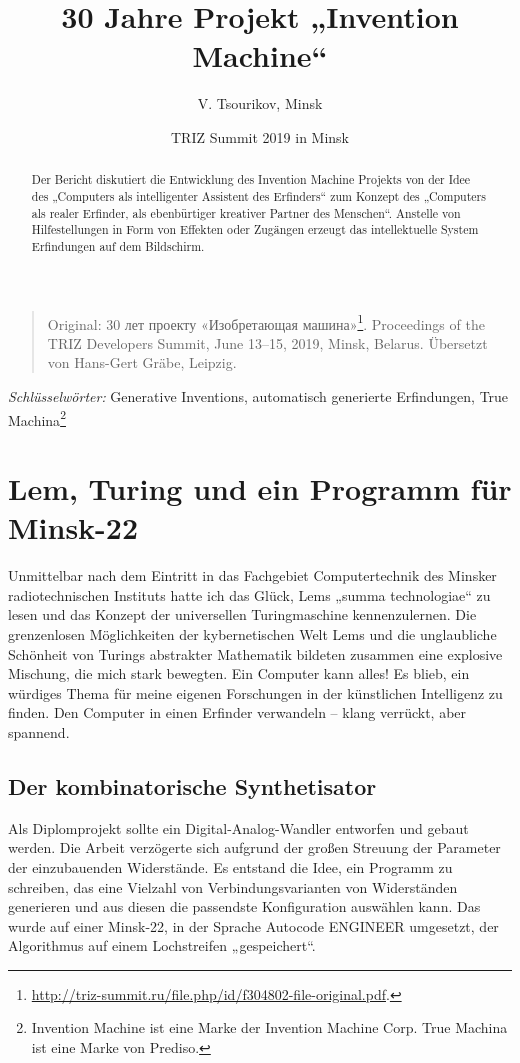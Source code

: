 \documentclass[11pt,a4paper]{article}
\title{30 Jahre Projekt „Invention Machine“}
\author{V. Tsourikov, Minsk}
\date{TRIZ Summit 2019 in Minsk}
\begin{document}
\maketitle
\begin{quote}
  Original: \foreignlanguage{russian}{30 лет проекту «Изобретающая
    машина»}\footnote{\url{http://triz-summit.ru/file.php/id/f304802-file-original.pdf}.}.
  Proceedings of the TRIZ Developers Summit, June 13--15, 2019, Minsk,
  Belarus.  Übersetzt von Hans-Gert Gräbe, Leipzig. 
\end{quote}

\begin{abstract}  
  Der Bericht diskutiert die Entwicklung des Invention Machine Projekts von der
  Idee des „Computers als intelligenter Assistent des Erfinders“ zum Konzept des
  „Computers als realer Erfinder, als ebenbürtiger kreativer Partner des
  Menschen“. Anstelle von Hilfestellungen in Form von Effekten oder Zugängen
  erzeugt das intellektuelle System Erfindungen auf dem Bildschirm.
\end{abstract}

\emph{Schlüsselwörter:} Generative Inventions, automatisch generierte
Erfindungen, True Machina\footnote{ Invention Machine ist eine Marke der
  Invention Machine Corp.  True Machina ist eine Marke von Prediso.  }

\section{Lem, Turing und ein Programm für Minsk-22}

Unmittelbar nach dem Eintritt in das Fachgebiet Computertechnik des Minsker
radiotechnischen Instituts hatte ich das Glück, Lems „summa technologiae“ zu
lesen und das Konzept der universellen Turingmaschine kennenzulernen.  Die
grenzenlosen Möglichkeiten der kybernetischen Welt Lems und die unglaubliche
Schönheit von Turings abstrakter Mathematik bildeten zusammen eine explosive
Mischung, die mich stark bewegten. Ein Computer kann alles! Es blieb, ein
würdiges Thema für meine eigenen Forschungen in der künstlichen Intelligenz zu
finden. Den Computer in einen Erfinder verwandeln -- klang verrückt, aber
spannend.

\subsection{Der kombinatorische Synthetisator}

Als Diplomprojekt sollte ein Digital-Analog-Wandler entworfen und gebaut
werden.  Die Arbeit verzögerte sich aufgrund der großen Streuung der Parameter
der einzubauenden Widerstände. Es entstand die Idee, ein Programm zu
schreiben, das eine Vielzahl von Verbindungsvarianten von Widerständen
generieren und aus diesen die passendste Konfiguration auswählen kann.  Das
wurde auf einer Minsk-22, in der Sprache Autocode ENGINEER umgesetzt, der
Algorithmus auf einem Lochstreifen „gespeichert“.
\end{document}

